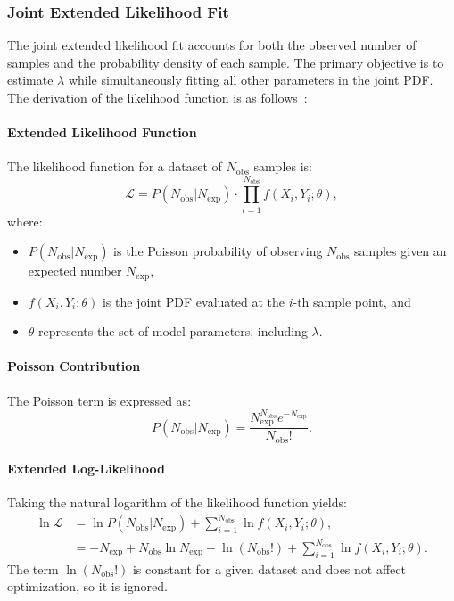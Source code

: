 \documentclass[11pt, a4paper]{article}
\begin{document}
\subsubsection{Joint Extended Likelihood Fit}

The joint extended likelihood fit accounts for both the observed number of samples and the probability density of each sample. The primary objective is to estimate \(\lambda\) while simultaneously fitting all other parameters in the joint PDF. The derivation of the likelihood function is as follows~\cite{wakefield2013bayesian}:
\paragraph{Extended Likelihood Function}
The likelihood function for a dataset of \( N_{\text{obs}} \) samples is:
\[
    \mathcal{L} = P(N_{\text{obs}} | N_{\text{exp}}) \cdot \prod_{i=1}^{N_{\text{obs}}} f(X_i, Y_i; \theta),
\]
where:
\begin{itemize}
    \item \( P(N_{\text{obs}} | N_{\text{exp}}) \) is the Poisson probability of observing \( N_{\text{obs}} \) samples given an expected number \( N_{\text{exp}} \),
    \item \( f(X_i, Y_i; \theta) \) is the joint PDF evaluated at the \( i \)-th sample point, and
    \item \( \theta \) represents the set of model parameters, including \(\lambda\).
\end{itemize}

\paragraph{Poisson Contribution}
The Poisson term is expressed as:
\begin{equation}
    P(N_{\text{obs}} | N_{\text{exp}}) = \frac{N_{\text{exp}}^{N_{\text{obs}}} e^{-N_{\text{exp}}}}{N_{\text{obs}}!}.
    \label{eq:poisson_term}
\end{equation}

\paragraph{Extended Log-Likelihood}
Taking the natural logarithm of the likelihood function yields:
\begin{align}
    \ln \mathcal{L} &= \ln P(N_{\text{obs}} | N_{\text{exp}}) + \sum_{i=1}^{N_{\text{obs}}} \ln f(X_i, Y_i; \theta), \\
    &= -N_{\text{exp}} + N_{\text{obs}} \ln N_{\text{exp}} - \ln(N_{\text{obs}}!) + \sum_{i=1}^{N_{\text{obs}}} \ln f(X_i, Y_i; \theta). \label{eq:log_likelihood}
\end{align}
The term \( \ln(N_{\text{obs}}!) \) is constant for a given dataset and does not affect optimization, so it is ignored.
\end{document}
